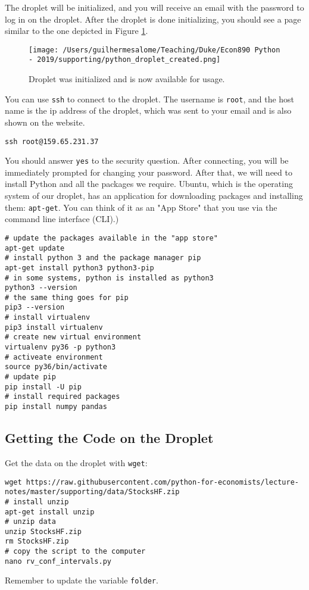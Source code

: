 \documentclass[12pt, a4paper]{article}
\begin{document}
The droplet will be initialized, and you will receive an email with the password to log in on the droplet.
After the droplet is done initializing, you should see a page similar to the one depicted in Figure \ref{fig:org9848ced}.

\begin{figure}[H]
\centering
\texttt{[image: /Users/guilhermesalome/Teaching/Duke/Econ890 Python - 2019/supporting/python\_droplet\_created.png]}
\caption{\label{fig:org9848ced}
Droplet was initialized and is now available for usage.}
\end{figure}

You can use \texttt{ssh} to connect to the droplet. The username is \texttt{root}, and the host name is the ip address of the droplet, which was sent to your email and is also shown on the website.
\lstset{language=bash,label= ,caption= ,captionpos=b,firstnumber=1,numbers=left,style=bash}
\begin{lstlisting}
ssh root@159.65.231.37
\end{lstlisting}
You should answer \texttt{yes} to the security question.
After connecting, you will be immediately prompted for changing your password.
After that, we will need to install Python and all the packages we require.
Ubuntu, which is the operating system of our droplet, has an application for downloading packages and installing them: \texttt{apt-get}.
You can think of it as an "App Store" that you use via the command line interface (CLI).)
\lstset{language=bash,label= ,caption= ,captionpos=b,firstnumber=1,numbers=left,style=bash}
\begin{lstlisting}
# update the packages available in the "app store"
apt-get update
# install python 3 and the package manager pip
apt-get install python3 python3-pip
# in some systems, python is installed as python3
python3 --version
# the same thing goes for pip
pip3 --version
# install virtualenv
pip3 install virtualenv
# create new virtual environment
virtualenv py36 -p python3
# activeate environment
source py36/bin/activate
# update pip
pip install -U pip
# install required packages
pip install numpy pandas
\end{lstlisting}
\subsection{Getting the Code on the Droplet}
\label{sec:org4b8e319}
Get the data on the droplet with \texttt{wget}:
\lstset{language=bash,label= ,caption= ,captionpos=b,firstnumber=1,numbers=left,style=bash}
\begin{lstlisting}
wget https://raw.githubusercontent.com/python-for-economists/lecture-notes/master/supporting/data/StocksHF.zip
# install unzip
apt-get install unzip
# unzip data
unzip StocksHF.zip
rm StocksHF.zip
# copy the script to the computer
nano rv_conf_intervals.py
\end{lstlisting}
Remember to update the variable \texttt{folder}.
\end{document}
